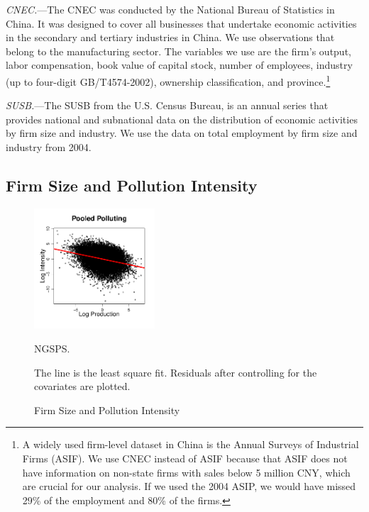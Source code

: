 \documentclass[AEJ]{AEA}
\begin{document}
\textit{CNEC.}---The CNEC was conducted by the National Bureau of Statistics in China. It was designed to cover {all} businesses that undertake economic activities in the secondary and tertiary industries in China. We use observations that belong to the manufacturing sector. The variables we use are the firm's output, labor compensation, book value of capital stock, number of employees, industry (up to four-digit GB/T4574-2002), ownership classification, and province.\footnote{A widely used firm-level dataset in China is the Annual Surveys of Industrial Firms (ASIF). We use CNEC instead of ASIF because that ASIF does not have information on non-state firms with sales below 5 million CNY, which are crucial for our analysis. If we used the 2004 ASIP, we would have missed 29\% of the employment and 80\% of the firms.}

\textit{SUSB.}---The SUSB from the U.S. Census Bureau, is an annual series that provides national and subnational data on the distribution of economic activities by firm size and industry. We use the data on total employment by firm size and industry from 2004.

\subsection{Firm Size and Pollution Intensity}

\begin{figure}[t]
\caption{Firm Size and Pollution Intensity}
\label{fig:codscatter}
    \begin{center}
    \includegraphics[width=0.40\textwidth]{./Figures/pooled_intensity_size.pdf}
    \end{center}
    \begin{figurenotes}[Source]
        NGSPS.
    \end{figurenotes}
    \begin{figurenotes}
        The line is the least square fit. Residuals after controlling for the covariates are plotted.
    \end{figurenotes}
\end{figure}
\end{document}
